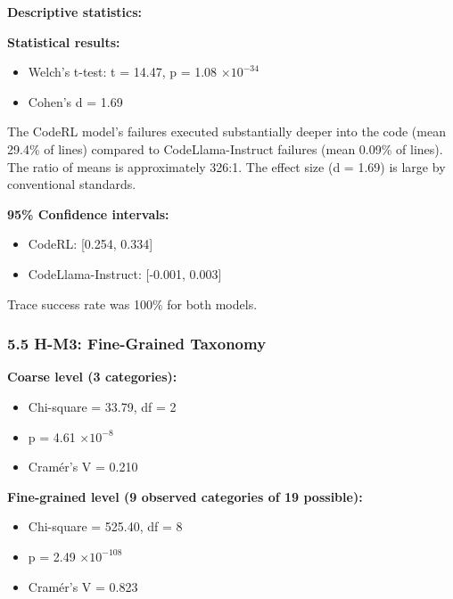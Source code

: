 \textbf{Descriptive statistics:}

\begin{table}[htbp]
\centering
{}
\end{table}

\textbf{Statistical results:}
\begin{itemize}
\item Welch's t-test: t = 14.47, p = 1.08 $\times 10^{-34}$
\item Cohen's d = 1.69
\end{itemize}

The CodeRL model's failures executed substantially deeper into the code (mean 29.4\% of lines) compared to CodeLlama-Instruct failures (mean 0.09\% of lines). The ratio of means is approximately 326:1. The effect size (d = 1.69) is large by conventional standards.

\textbf{95\% Confidence intervals:}
\begin{itemize}
\item CodeRL: [0.254, 0.334]
\item CodeLlama-Instruct: [-0.001, 0.003]
\end{itemize}

Trace success rate was 100\% for both models.

\subsubsection{5.5 H-M3: Fine-Grained Taxonomy}

\textbf{Coarse level (3 categories):}
\begin{itemize}
\item Chi-square = 33.79, df = 2
\item p = 4.61 $\times 10^{-8}$
\item Cramér's V = 0.210
\end{itemize}

\textbf{Fine-grained level (9 observed categories of 19 possible):}
\begin{itemize}
\item Chi-square = 525.40, df = 8
\item p = 2.49 $\times 10^{-108}$
\item Cramér's V = 0.823
\end{itemize}

